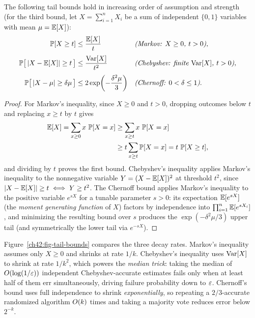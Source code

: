\begin{theorem}
\label{ch42:thm-concentration}
The following tail bounds hold in increasing order of assumption and strength (for the third bound, let $X = \sum_{i=1}^n X_i$ be a sum of independent $\{0,1\}$ variables with mean $\mu = \operatorname{\mathbb{E}}[X]$):
\begin{align*}
  \operatorname{\mathbb{P}}[X \ge t] &\le \frac{\operatorname{\mathbb{E}}[X]}{t}
    && \text{\emph{(Markov: $X \ge 0$, $t > 0$)},} \\[3pt]
  \operatorname{\mathbb{P}}\bigl[\,\lvert X - \operatorname{\mathbb{E}}[X]\rvert \ge t\,\bigr] &\le \frac{\operatorname{Var}[X]}{t^2}
    && \text{\emph{(Chebyshev: finite $\operatorname{Var}[X]$, $t > 0$)},} \\[3pt]
  \operatorname{\mathbb{P}}\bigl[\,\lvert X - \mu\rvert \ge \delta\mu\,\bigr] &\le 2\exp\!\left(-\frac{\delta^2\mu}{3}\right)
    && \text{\emph{(Chernoff: $0 < \delta \le 1$)}.}
\end{align*}
\end{theorem}

\begin{proof}
For Markov's inequality, since $X \ge 0$ and $t > 0$, dropping outcomes below $t$ and replacing $x \ge t$ by $t$ gives
\begin{align*}
  \operatorname{\mathbb{E}}[X] = \sum_{x \ge 0} x\,\operatorname{\mathbb{P}}[X = x]
  &\ge \sum_{x \ge t} x\,\operatorname{\mathbb{P}}[X = x] \\
  &\ge t \sum_{x \ge t} \operatorname{\mathbb{P}}[X = x] = t\,\operatorname{\mathbb{P}}[X \ge t],
\end{align*}
and dividing by $t$ proves the first bound. Chebyshev's inequality applies Markov's inequality to the nonnegative variable $Y = (X - \operatorname{\mathbb{E}}[X])^2$ at threshold $t^2$, since $\lvert X - \operatorname{\mathbb{E}}[X]\rvert \ge t \iff Y \ge t^2$. The Chernoff bound applies Markov's inequality to the positive variable $e^{sX}$ for a tunable parameter $s > 0$: its expectation $\operatorname{\mathbb{E}}[e^{sX}]$ (the \emph{moment generating function} of $X$) factors by independence into $\prod_{i=1}^n \operatorname{\mathbb{E}}[e^{sX_i}]$, and minimizing the resulting bound over $s$ produces the $\exp(-\delta^2\mu/3)$ upper tail (and symmetrically the lower tail via $e^{-sX}$).
\end{proof}

\begin{intuitionbox}
Figure~\ref{ch42:fig-tail-bounds} compares the three decay rates. Markov's inequality assumes only $X \ge 0$ and shrinks at rate $1/k$. Chebyshev's inequality uses $\operatorname{Var}[X]$ to shrink at rate $1/k^2$, which powers the \emph{median trick}: taking the median of $O(\log(1/\varepsilon))$ independent Chebyshev-accurate estimates fails only when at least half of them err simultaneously, driving failure probability down to $\varepsilon$. Chernoff's bound uses full independence to shrink \emph{exponentially}, so repeating a $2/3$-accurate randomized algorithm $O(k)$ times and taking a majority vote reduces error below $2^{-k}$.
\end{intuitionbox}

